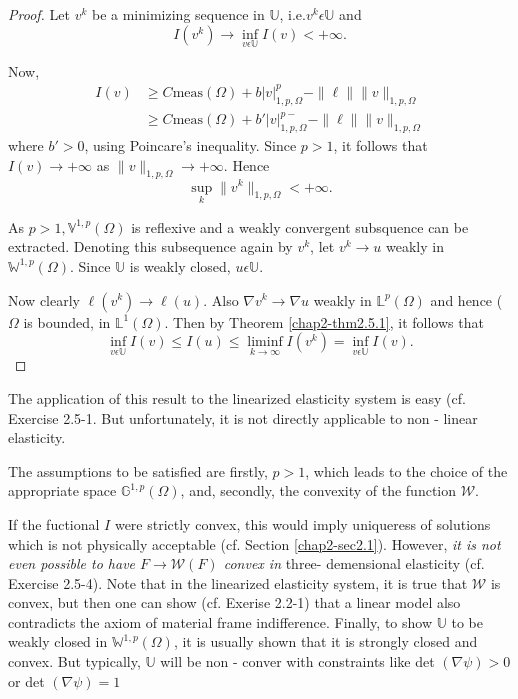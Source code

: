 \begin{proof}
  Let $v^k$ be a minimizing sequence in $\mathbb{U}$, i.e.$v^k
  \epsilon \mathbb{U}$ and  
  $$
  I(v^k) \rightarrow \inf \limits_{v \epsilon \mathbb{U}} I(v) < + \infty.
  $$

Now,\pageoriginale
\begin{align*}
  I(v) & \ge C \text{meas}(\Omega) + b|v|^p_{1,p,\Omega} - \| \ell \|
  \| v \|_{1,p, \Omega} \\ 
  &\ge C \text{meas}(\Omega) + b'|v|^{p-}_{1,p,\Omega} - \| \ell \| \|
  v \|_{1,p, \Omega} 
\end{align*}
where $b' > 0$, using Poincare's inequality. Since $p >1$, it follows
that $I(v) \rightarrow + \infty$ as $\| v \|_{1,p, \Omega} \rightarrow
+ \infty$. Hence 
$$
\sup\limits_{k} \| v^k \| _{1,p, \Omega} < + \infty .
$$

As $p > 1, \mathbb{V}^{1,p}(\Omega)$ is reflexive and a weakly
convergent subsquence can be extracted. Denoting this subsequence
again by $v^k$, let $v^k \rightarrow u$ weakly in
$\mathbb{W}^{1,p}(\Omega).$ Since $\mathbb{U}$ is weakly closed, $u
\epsilon \mathbb{U}$. 

Now clearly $\ell (v^k) \rightarrow \ell (u)$. Also $\nabla v^k
\rightarrow \nabla u$ weakly in $\mathbb{L}^p(\Omega)$ and
hence ($\Omega$ is bounded, in $\mathbb{L}^1(\Omega)$. Then by Theorem
\ref{chap2-thm2.5.1}, it follows that  
$$
\inf\limits_{v \epsilon \mathbb{U}} I(v) \le I(u) \le \liminf_{k
  \rightarrow \infty} I(v^k) = \inf\limits_{v \epsilon \mathbb{U}}
I(v). 
$$
\end{proof}

\begin{remark}\label{chap2-rem2.5.4}%
  The application of this result to the linearized elasticity system
  is easy (cf. Exercise 2.5-1. But unfortunately, it is not
  directly applicable to non - linear elasticity. 
\end{remark}

The assumptions to be satisfied are firstly, $p > 1$, which leads to
the choice of the appropriate space $\mathbb{G}^{1,p}(\Omega)$, and,
secondly, the convexity of the function $\mathcal{W}$. 

If the fuctional $I$ were strictly convex, this would imply uniqueress
of solutions which is not physically acceptable (cf. Section
\ref{chap2-sec2.1}). However, {\em it is not even possible to have
$F \rightarrow 
\mathcal{W}(F)$ convex in} three\pageoriginale - demensional
elasticity (cf. Exercise 
2.5-4). Note that in the linearized elasticity system, it is true
that $\mathcal{W}$ is convex, but then one can show (cf. Exerise
2.2-1) that a linear model also contradicts the axiom of material
frame indifference. Finally, to show $\mathbb{U}$ to be weakly closed
in $\mathbb{W}^{1,p}(\Omega)$, it is usually shown that it is strongly
closed and convex. But typically, $\mathbb{U}$ will be non - conver
with constraints like det $(\nabla \psi) > 0$ or det
$(\nabla \psi) = 1$ 

